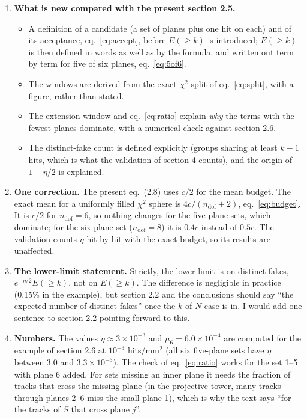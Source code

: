 \documentclass[a4paper,11pt]{article}
\newcommand{\ndof}{n_\mathrm{dof}}
\begin{document}
\begin{enumerate}
\item \textbf{What is new compared with the present section 2.5.}
  \begin{itemize}
  \item A definition of a candidate (a set of planes plus one hit on each) and of its
    acceptance, eq.~\eqref{eq:accept}, before $E(\ge k)$ is introduced; $E(\ge k)$ is then
    defined in words as well as by the formula, and written out term by term for five of six
    planes, eq.~\eqref{eq:5of6}.
  \item The windows are derived from the exact $\chi^2$ split of eq.~\eqref{eq:split}, with a
    figure, rather than stated.
  \item The extension window and eq.~\eqref{eq:ratio} explain \emph{why} the terms with the
    fewest planes dominate, with a numerical check against section 2.6.
  \item The distinct-fake count is defined explicitly (groups sharing at least $k-1$ hits,
    which is what the validation of section 4 counts), and the origin of $1-\eta/2$ is
    explained.
  \end{itemize}

\item \textbf{One correction.} The present eq.~(2.8) uses $c/2$ for the mean budget. The
  exact mean for a uniformly filled $\chi^2$ sphere is $4c/(\ndof+2)$, eq.~\eqref{eq:budget}.
  It is $c/2$ for $\ndof=6$, so nothing changes for the five-plane sets, which dominate; for the
  six-plane set ($\ndof=8$) it is $0.4c$ instead of $0.5c$. The validation counts $\eta$ hit by
  hit with the exact budget, so its results are unaffected.

\item \textbf{The lower-limit statement.} Strictly, the lower limit is on distinct fakes,
  $e^{-\eta/2}E(\ge k)$, not on $E(\ge k)$. The difference is negligible in practice (0.15\% in
  the example), but section 2.2 and the conclusions should say ``the expected number of distinct
  fakes'' once the $k$-of-$N$ case is in. I would add one sentence to section 2.2 pointing
  forward to this.

\item \textbf{Numbers.} The values $\eta\approx3\times10^{-3}$ and $\mu_6=6.0\times10^{-4}$ are
  computed for the example of section 2.6 at $10^{-3}$ hits/mm$^2$ (all six five-plane sets have
  $\eta$ between $3.0$ and $3.3\times10^{-3}$). The check of eq.~\eqref{eq:ratio} works for the
  set 1--5 with plane 6 added. For sets missing an inner plane it needs the fraction of tracks
  that cross the missing plane (in the projective tower, many tracks through planes 2--6 miss
  the small plane 1), which is why the text says ``for the tracks of $S$ that cross plane $j$''.


\end{enumerate}
\end{document}
